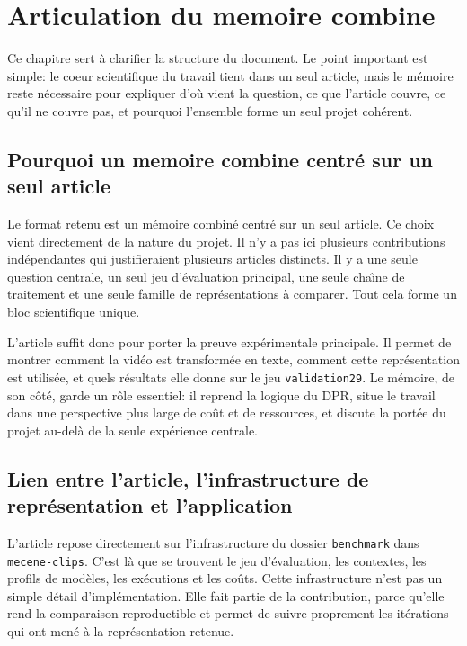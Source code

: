 \chapter{Articulation du memoire combine}

Ce chapitre sert \`a clarifier la structure du document. Le point important est simple: le coeur scientifique du travail tient dans un seul article, mais le m\'emoire reste n\'ecessaire pour expliquer d'o\`u vient la question, ce que l'article couvre, ce qu'il ne couvre pas, et pourquoi l'ensemble forme un seul projet coh\'erent.

\section{Pourquoi un memoire combine centr\'e sur un seul article}

Le format retenu est un m\'emoire combin\'e centr\'e sur un seul article. Ce choix vient directement de la nature du projet. Il n'y a pas ici plusieurs contributions ind\'ependantes qui justifieraient plusieurs articles distincts. Il y a une seule question centrale, un seul jeu d'\'evaluation principal, une seule cha\^\i ne de traitement et une seule famille de repr\'esentations \`a comparer. Tout cela forme un bloc scientifique unique.

L'article suffit donc pour porter la preuve exp\'erimentale principale. Il permet de montrer comment la vid\'eo est transform\'ee en texte, comment cette repr\'esentation est utilis\'ee, et quels r\'esultats elle donne sur le jeu \texttt{validation29}. Le m\'emoire, de son c\^ot\'e, garde un r\^ole essentiel: il reprend la logique du DPR, situe le travail dans une perspective plus large de co\^ut et de ressources, et discute la port\'ee du projet au-del\`a de la seule exp\'erience centrale.

\section{Lien entre l'article, l'infrastructure de repr\'esentation et l'application}

L'article repose directement sur l'infrastructure du dossier \texttt{benchmark} dans \texttt{mecene-clips}. C'est l\`a que se trouvent le jeu d'\'evaluation, les contextes, les profils de mod\`eles, les ex\'ecutions et les co\^uts. Cette infrastructure n'est pas un simple d\'etail d'impl\'ementation. Elle fait partie de la contribution, parce qu'elle rend la comparaison reproductible et permet de suivre proprement les it\'erations qui ont men\'e \`a la repr\'esentation retenue.

